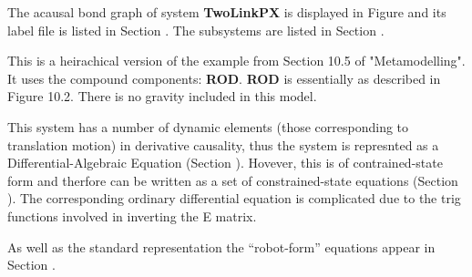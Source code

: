 
%

   The acausal bond graph of system \textbf{TwoLinkPX} is
   displayed in Figure  and its label
   file is listed in Section .
   The subsystems are listed in Section .

This is a heirachical version of the example from Section 10.5 of
"Metamodelling".  It uses the compound components: {\bf ROD}.  {\bf
ROD} is essentially as described in Figure 10.2.
There is no gravity included in this model.

This system has a number of dynamic elements (those corresponding to translation
motion) in derivative causality, thus the system is represnted as a
Differential-Algebraic Equation (Section
). Hovever, this is of contrained-state form and
therfore can be written as a set of constrained-state equations (Section
). The corresponding ordinary differential
equation is complicated due to the trig functions involved in
inverting the E matrix.

As well as the standard representation the ``robot-form'' equations
appear in Section  . 

